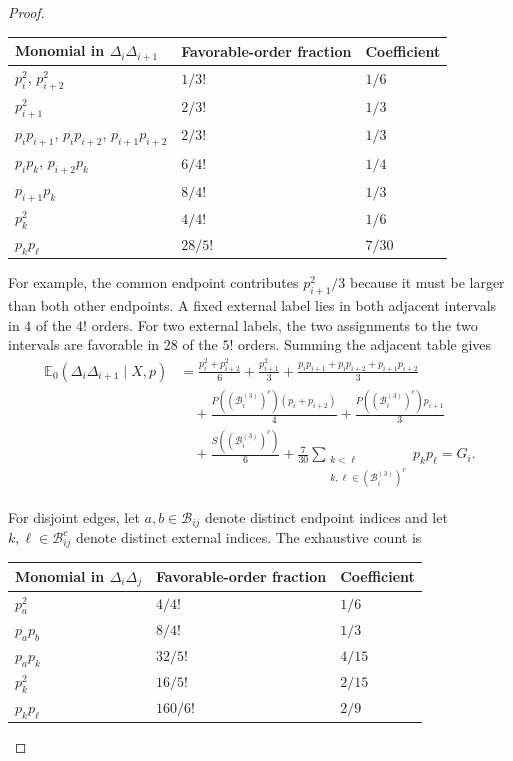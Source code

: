 \begin{proof}
\begin{center}
\begin{tabular}{lll}
  \toprule
  Monomial in $\Delta_i\Delta_{i+1}$
    & Favorable-order fraction & Coefficient \\
  \midrule
  $p_i^2$, $p_{i+2}^2$                         & $1/3!$   & $1/6$ \\
  $p_{i+1}^2$                                  & $2/3!$   & $1/3$ \\
  $p_ip_{i+1}$, $p_ip_{i+2}$, $p_{i+1}p_{i+2}$& $2/3!$   & $1/3$ \\
  $p_ip_k$, $p_{i+2}p_k$                       & $6/4!$   & $1/4$ \\
  $p_{i+1}p_k$                                 & $8/4!$   & $1/3$ \\
  $p_k^2$                                      & $4/4!$   & $1/6$ \\
  $p_kp_\ell$                                  & $28/5!$  & $7/30$ \\
  \bottomrule
\end{tabular}
\end{center}

For example, the common endpoint contributes $p_{i+1}^2/3$ because it must
be larger than both other endpoints. A fixed external label lies in both
adjacent intervals in $4$ of the $4!$ orders. For two external labels, the
two assignments to the two intervals are favorable in $28$ of the $5!$
orders. Summing the adjacent table gives
\begin{align*}
  \mathbb E_0(\Delta_i\Delta_{i+1}\mid X,p)
  &=\frac{p_i^2+p_{i+2}^2}{6}+\frac{p_{i+1}^2}{3}
    +\frac{p_ip_{i+1}+p_ip_{i+2}+p_{i+1}p_{i+2}}{3}\\
  &\quad
    +\frac{P((\mathcal B_i^{(3)})^c)(p_i+p_{i+2})}{4}
    +\frac{P((\mathcal B_i^{(3)})^c)p_{i+1}}{3}\\
  &\quad
    +\frac{S((\mathcal B_i^{(3)})^c)}{6}
    +\frac7{30}
      \sum_{\substack{k<\ell\\k,\ell\in(\mathcal B_i^{(3)})^c}}
      p_kp_\ell
  =G_i.
\end{align*}

For disjoint edges, let $a,b\in\mathcal B_{ij}$ denote distinct endpoint
indices and let $k,\ell\in\mathcal B_{ij}^c$ denote distinct external
indices. The exhaustive count is

\begin{center}
\begin{tabular}{lll}
  \toprule
  Monomial in $\Delta_i\Delta_j$
    & Favorable-order fraction & Coefficient \\
  \midrule
  $p_a^2$       & $4/4!$   & $1/6$ \\
  $p_ap_b$      & $8/4!$   & $1/3$ \\
  $p_ap_k$      & $32/5!$  & $4/15$ \\
  $p_k^2$       & $16/5!$  & $2/15$ \\
  $p_kp_\ell$   & $160/6!$ & $2/9$ \\
  \bottomrule
\end{tabular}
\end{center}


\end{proof}
